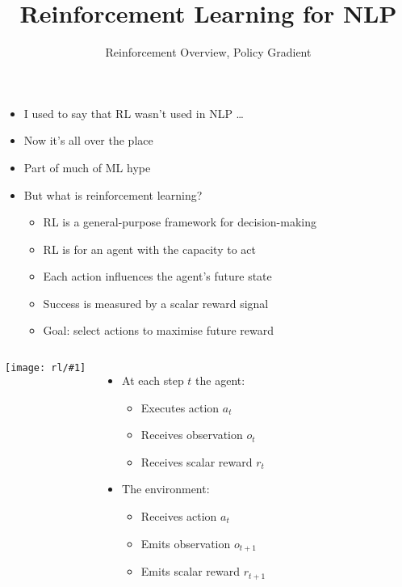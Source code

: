 \documentclass[compress]{beamer}
\title{Reinforcement Learning for NLP}
\date{Reinforcement Overview, Policy Gradient}
\newcommand{\gfx}[2]{
\begin{center}
	\texttt{[image: rl/\#1]}
\end{center}
}
\begin{document}

\begin{frame}

  \begin{itemize}
    \item I used to say that RL wasn't used in NLP \dots
    \item Now it's all over the place
    \item Part of much of ML hype
    \item But what is reinforcement learning?
      \pause
      \begin{itemize}
\item RL is a general-purpose framework for decision-making
\item RL is for an agent with the capacity to act
\item  Each action influences the agent's future state
\item  Success is measured by a scalar reward signal
\item  Goal: select actions to maximise future reward
      \end{itemize}
  \end{itemize}

\end{frame}

\begin{frame}

\begin{columns}

  \gfx{big_picture}{1.0}
  \begin{itemize}
\item At each step $t$ the agent:
\begin{itemize}
\item Executes action $a_t$
\item Receives observation $o_t$
\item Receives scalar reward $r_t$
\end{itemize}
\item The environment:
\begin{itemize}
\item Receives action $a_t$
\item Emits observation $o_{t+1}$
\item Emits scalar reward $r_{t+1}$
    \end{itemize}
    \end{itemize}
\end{columns}

\end{frame}
\end{document}
